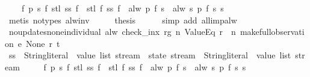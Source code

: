 \begin{isabellebody}
\ \ \ \ {\isachardoublequoteopen}{\isasymforall}f\ p\ s{\isachardot}\ f\ {\isacharparenleft}stl\ {\isacharparenleft}ss\ f{\isacharparenright}{\isacharparenright}\ {\isasymnoteq}\ stl\ {\isacharparenleft}f\ {\isacharparenleft}ss\ f{\isacharparenright}{\isacharparenright}\ {\isasymor}\ alw\ p\ {\isacharparenleft}f\ s{\isacharparenright}\ {\isacharequal}\ alw\ {\isacharparenleft}{\isasymlambda}s{\isachardot}\ p\ {\isacharparenleft}f\ s{\isacharparenright}{\isacharparenright}\ s{\isachardoublequoteclose}\isanewline
\ \ \ \ \isamarkupfalse%
\ {\isacharparenleft}metis\ {\isacharparenleft}no{\isacharunderscore}types{\isacharparenright}\ alw{\isacharunderscore}inv{\isacharparenright}\isanewline
\ \ \isamarkupfalse%
\ \isamarkupfalse%
\ {\isacharquery}thesis\isanewline
\ \ \ \ \isamarkupfalse%
\ {\isacharparenleft}simp\ add{\isacharcolon}\ all{\isacharunderscore}imp{\isacharunderscore}alw{\isacharparenright}\isanewline
{}\isamarkupfalse%
%
\endisatagproof
{\isafoldproof}%
%
\isadelimproof
\isanewline
%
\endisadelimproof
\isanewline
{}\isamarkupfalse%
\ no{\isacharunderscore}updates{\isacharunderscore}none{\isacharunderscore}individual{\isacharcolon}\ {\isachardoublequoteopen}alw\ {\isacharparenleft}check_inx\ rg\ n\ ValueEq\ {\isacharparenleft}r\ {\isachardollar}\ n{\isacharparenright}{\isacharparenright}\ {\isacharparenleft}make{\isacharunderscore}full{\isacharunderscore}observation\ e\ None\ r\ t{\isacharparenright}{\isachardoublequoteclose}\isanewline
%
\isadelimproof
%
\endisadelimproof
%
\isatagproof
{}\isamarkupfalse%
\ {\isacharminus}\isanewline
\ \ \isamarkupfalse%
\ ss\ {\isacharcolon}{\isacharcolon}\ {\isachardoublequoteopen}{\isacharparenleft}{\isacharparenleft}String{\isachardot}literal\ {\isasymtimes}\ value\ list{\isacharparenright}\ stream\ {\isasymRightarrow}\ state\ stream{\isacharparenright}\ {\isasymRightarrow}\ {\isacharparenleft}String{\isachardot}literal\ {\isasymtimes}\ value\ list{\isacharparenright}\ stream{\isachardoublequoteclose}\ \isanewline
\ \ \ \ {\isachardoublequoteopen}{\isasymforall}f\ p\ s{\isachardot}\ f\ {\isacharparenleft}stl\ {\isacharparenleft}ss\ f{\isacharparenright}{\isacharparenright}\ {\isasymnoteq}\ stl\ {\isacharparenleft}f\ {\isacharparenleft}ss\ f{\isacharparenright}{\isacharparenright}\ {\isasymor}\ alw\ p\ {\isacharparenleft}f\ s{\isacharparenright}\ {\isacharequal}\ alw\ {\isacharparenleft}{\isasymlambda}s{\isachardot}\ p\ {\isacharparenleft}f\ s{\isacharparenright}{\isacharparenright}\ s{\isachardoublequoteclose}\isanewline

\end{isabellebody}
